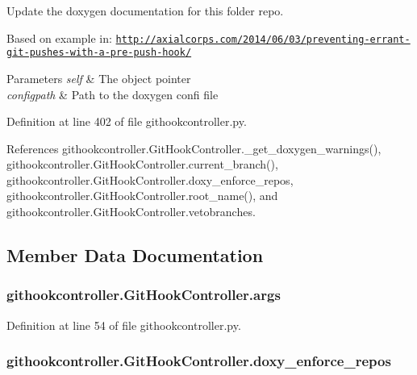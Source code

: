 Update the doxygen documentation for this folder repo. 

Based on example in\-: \href{http://axialcorps.com/2014/06/03/preventing-errant-git-pushes-with-a-pre-push-hook/}{\tt http\-://axialcorps.\-com/2014/06/03/preventing-\/errant-\/git-\/pushes-\/with-\/a-\/pre-\/push-\/hook/}


\begin{DoxyParams}{Parameters}
{\em self} & The object pointer \\
\hline
{\em configpath} & Path to the doxygen confi file \\
\hline
\end{DoxyParams}


Definition at line 402 of file githookcontroller.\-py.



References githookcontroller.\-Git\-Hook\-Controller.\-\_\-get\-\_\-doxygen\-\_\-warnings(), githookcontroller.\-Git\-Hook\-Controller.\-current\-\_\-branch(), githookcontroller.\-Git\-Hook\-Controller.\-doxy\-\_\-enforce\-\_\-repos, githookcontroller.\-Git\-Hook\-Controller.\-root\-\_\-name(), and githookcontroller.\-Git\-Hook\-Controller.\-vetobranches.



\subsection{Member Data Documentation}
\subsubsection[{args}]{\setlength{\rightskip}{0pt plus 5cm}githookcontroller.\-Git\-Hook\-Controller.\-args}\label{classgithookcontroller_1_1GitHookController_a86262238108e9a37e5b3ca47e4f9b94e}


Definition at line 54 of file githookcontroller.\-py.

\subsubsection[{doxy\-\_\-enforce\-\_\-repos}]{\setlength{\rightskip}{0pt plus 5cm}githookcontroller.\-Git\-Hook\-Controller.\-doxy\-\_\-enforce\-\_\-repos}\label{classgithookcontroller_1_1GitHookController_aa8e96fe61c7a24a30c5d4a2abcbd49dc}


